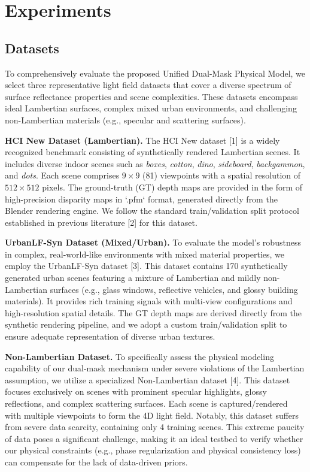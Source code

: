 \section{Experiments}

\subsection{Datasets}

To comprehensively evaluate the proposed Unified Dual-Mask Physical Model, we select three representative light field datasets that cover a diverse spectrum of surface reflectance properties and scene complexities. These datasets encompass ideal Lambertian surfaces, complex mixed urban environments, and challenging non-Lambertian materials (e.g., specular and scattering surfaces). 

\textbf{HCI New Dataset (Lambertian).} The HCI New dataset [1] is a widely recognized benchmark consisting of synthetically rendered Lambertian scenes. It includes diverse indoor scenes such as \textit{boxes}, \textit{cotton}, \textit{dino}, \textit{sideboard}, \textit{backgammon}, and \textit{dots}. Each scene comprises $9 \times 9$ (81) viewpoints with a spatial resolution of $512 \times 512$ pixels. The ground-truth (GT) depth maps are provided in the form of high-precision disparity maps in `.pfm` format, generated directly from the Blender rendering engine. We follow the standard train/validation split protocol established in previous literature [2] for this dataset.

\textbf{UrbanLF-Syn Dataset (Mixed/Urban).} To evaluate the model's robustness in complex, real-world-like environments with mixed material properties, we employ the UrbanLF-Syn dataset [3]. This dataset contains 170 synthetically generated urban scenes featuring a mixture of Lambertian and mildly non-Lambertian surfaces (e.g., glass windows, reflective vehicles, and glossy building materials). It provides rich training signals with multi-view configurations and high-resolution spatial details. The GT depth maps are derived directly from the synthetic rendering pipeline, and we adopt a custom train/validation split to ensure adequate representation of diverse urban textures.

\textbf{Non-Lambertian Dataset.} To specifically assess the physical modeling capability of our dual-mask mechanism under severe violations of the Lambertian assumption, we utilize a specialized Non-Lambertian dataset [4]. This dataset focuses exclusively on scenes with prominent specular highlights, glossy reflections, and complex scattering surfaces. Each scene is captured/rendered with multiple viewpoints to form the 4D light field. Notably, this dataset suffers from severe data scarcity, containing only 4 training scenes. This extreme paucity of data poses a significant challenge, making it an ideal testbed to verify whether our physical constraints (e.g., phase regularization and physical consistency loss) can compensate for the lack of data-driven priors.

